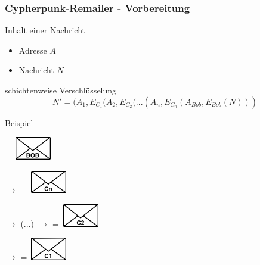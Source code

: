 \documentclass{beamer}
\begin{document}
\begin{frame}
	\frametitle{Cypherpunk-Remailer - Vorbereitung}
	\begin{block}{Inhalt einer Nachricht}	
		\begin{itemize}	
			\item Adresse \(A\)
			\item Nachricht \(N\)
		\end{itemize}	
	\end{block}	
	\begin{block}{schichtenweise Verschlüsselung}	
		\begin{equation}
			N' = (A_1, E_{C_1}(A_2, E_{C_2} (... (A_n,  E_{C_n}(A_{Bob}, E_{Bob}(N)))
		\end{equation}	
	\end{block}	

	\begin{exampleblock}{Beispiel}	
		\begin{center}
		\begingroup
			=\hbox{
				\includegraphics[height=1cm]{bilder/nachricht_bob.jpg}}%
			\parbox{\wd0}{}
		\endgroup
		\hspace{0.1cm}
		$\rightarrow$
		\hspace{0.1cm}
		\begingroup
			=\hbox{
				\includegraphics[height=1cm]{bilder/nachricht_cn.jpg}}%
			\parbox{\wd0}{\box0}
		\endgroup
		\hspace{0.1cm}
		$\rightarrow$ \hspace{0.1cm} (...)
		\hspace{0.1cm}
		$\rightarrow$
		\hspace{0.1cm}
		\begingroup
			\setbox0=\hbox{
				\includegraphics[height=1cm]{bilder/nachricht_c2.jpg}}%
			\parbox{\wd0}{}
		\endgroup
		\hspace{0.1cm}
		$\rightarrow$
		\hspace{0.1cm}
		\begingroup
			=\hbox{
				\includegraphics[height=1cm]{bilder/nachricht_c1.jpg}}%
			\parbox{\wd0}{}
		\endgroup
		\end{center}
	\end{exampleblock}	
\end{frame}
\end{document}
